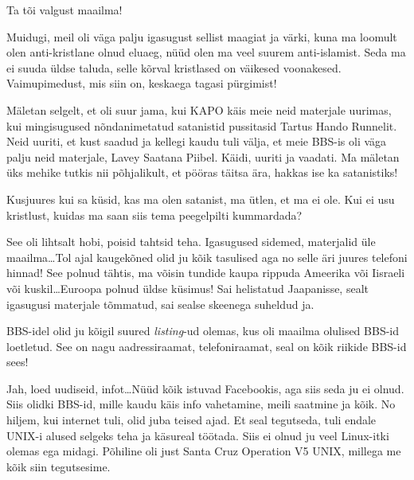 
Ta tõi valgust maailma! 

Muidugi, meil oli väga palju igasugust sellist maagiat ja värki, kuna ma loomult olen anti-kristlane olnud eluaeg, nüüd olen ma veel suurem anti-islamist. Seda ma ei suuda üldse taluda,  selle kõrval kristlased on väikesed voonakesed. Vaimupimedust, mis siin on, keskaega tagasi pürgimist! 

Mäletan selgelt, et oli suur jama, kui KAPO käis meie neid materjale uurimas, kui mingisugused nõndanimetatud satanistid pussitasid Tartus Hando Runnelit. Neid uuriti, et kust saadud ja kellegi kaudu tuli  välja, et meie BBS-is oli väga palju neid materjale, Lavey Saatana Piibel. Käidi, uuriti ja vaadati. Ma mäletan üks mehike tutkis nii põhjalikult, et pööras täitsa ära, hakkas ise ka satanistiks!

Kusjuures kui sa küsid, kas ma olen satanist, ma ütlen, et ma ei ole. Kui ei usu kristlust, kuidas ma saan siis tema peegelpilti kummardada?


See oli lihtsalt hobi, poisid tahtsid teha. Igasugused sidemed, materjalid üle maailma\ldots Tol ajal kaugekõned olid ju kõik tasulised aga no selle äri juures telefoni hinnad! See polnud tähtis, ma võisin tundide kaupa rippuda Ameerika või Iisraeli või kuskil\ldots Euroopa polnud üldse küsimus! Sai helistatud Jaapanisse, sealt igasugusi materjale tõmmatud, sai sealse skeenega suheldud ja.


BBS-idel olid ju kõigil suured \emph{listing}-ud olemas, kus oli maailma olulised BBS-id loetletud. See on nagu aadressiraamat,  telefoniraamat, seal on kõik riikide BBS-id sees! 


Jah, loed uudiseid, infot\ldots Nüüd  kõik istuvad Facebookis, aga siis seda ju ei olnud. Siis olidki BBS-id, mille kaudu käis info vahetamine, meili saatmine ja kõik. No hiljem, kui internet tuli, olid juba teised ajad. Et seal tegutseda, tuli endale UNIX-i alused selgeks teha ja käsureal töötada. Siis ei olnud ju veel Linux-itki olemas ega midagi. Põhiline oli just Santa Cruz Operation V5 UNIX, millega me kõik siin tegutsesime.

